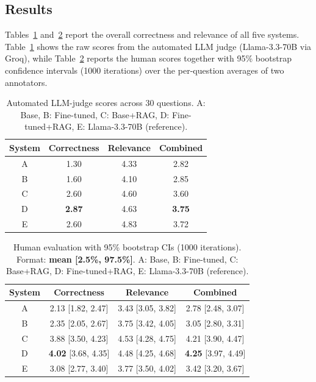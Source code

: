 \documentclass[fleqn,moreauthors,10pt]{ds_report}
\begin{document}


\subsection*{Results}

Tables~\ref{tab:overall-ai} and~\ref{tab:overall-human} report the overall correctness and relevance of all five systems. Table~\ref{tab:overall-ai} shows the raw scores from the automated LLM judge (Llama-3.3-70B via Groq), while Table~\ref{tab:overall-human} reports the human scores together with 95\% bootstrap confidence intervals (1000 iterations) over the per-question averages of two annotators.

\begin{table}[h]
\centering
\footnotesize
\caption{Automated LLM-judge scores across 30 questions.
A: Base, B: Fine-tuned, C: Base+RAG, D: Fine-tuned+RAG, E: Llama-3.3-70B (reference).}
\label{tab:overall-ai}
\begin{tabular}{cccc}
\toprule
System & Correctness & Relevance & Combined \\
\midrule
A & 1.30 & 4.33 & 2.82 \\
B & 1.60 & 4.10 & 2.85 \\
C & 2.60 & 4.60 & 3.60 \\
D & \textbf{2.87} & 4.63 & \textbf{3.75} \\
E & 2.60 & 4.83 & 3.72 \\
\bottomrule
\end{tabular}
\end{table}

\begin{table}[h]
\centering
\scriptsize
\caption{Human evaluation with 95\% bootstrap CIs (1000 iterations). Format: \textbf{mean [2.5\%, 97.5\%]}.
A: Base, B: Fine-tuned, C: Base+RAG, D: Fine-tuned+RAG, E: Llama-3.3-70B (reference).}
\label{tab:overall-human}
\begin{tabular}{cccc}
\toprule
System & Correctness & Relevance & Combined \\
\midrule
A & 2.13 [1.82, 2.47] & 3.43 [3.05, 3.82] & 2.78 [2.48, 3.07] \\
B & 2.35 [2.05, 2.67] & 3.75 [3.42, 4.05] & 3.05 [2.80, 3.31] \\
C & 3.88 [3.50, 4.23] & 4.53 [4.28, 4.75] & 4.21 [3.90, 4.47] \\
D & \textbf{4.02} [3.68, 4.35] & 4.48 [4.25, 4.68] & \textbf{4.25} [3.97, 4.49] \\
E & 3.08 [2.77, 3.40] & 3.77 [3.50, 4.02] & 3.42 [3.20, 3.67] \\
\bottomrule
\end{tabular}
\end{table}
\end{document}

